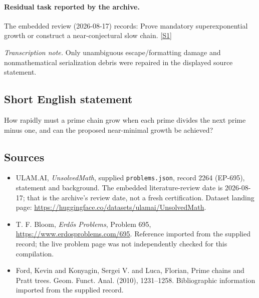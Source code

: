 \documentclass[11pt,a4paper]{article}
\newcommand{\sref}[2]{\hyperlink{source:#1:#2}{[S#2]}}
\begin{document}
\paragraph{Residual task reported by the archive.}

The embedded review (2026-08-17) records: Prove mandatory superexponential growth or construct a near-conjectural slow chain. \sref{2264}{1}

{\small\emph{Transcription note.} Only unambiguous escape/formatting damage and nonmathematical serialization debris were repaired in the displayed source statement.}

\subsection{Short English statement}

How rapidly must a prime chain grow when each prime divides the next prime minus one, and can the proposed near-minimal growth be achieved?

\subsection{Sources}

{\small

\begin{itemize}

\item[\hypertarget{source:2264:1}{S1}] ULAM.AI, \emph{UnsolvedMath}, supplied \texttt{problems.json}, record 2264 (EP-695), statement and background. The embedded literature-review date is 2026-08-17; that is the archive’s review date, not a fresh certification. Dataset landing page: \url{https://huggingface.co/datasets/ulamai/UnsolvedMath}.

\item[\hypertarget{source:2264:2}{S2}] T. F. Bloom, \emph{Erdős Problems}, Problem 695, \url{https://www.erdosproblems.com/695}. Reference imported from the supplied record; the live problem page was not independently checked for this compilation.

\item[\hypertarget{source:2264:3}{S3}] Ford, Kevin and Konyagin, Sergei V. and Luca, Florian, Prime chains and {P}ratt trees. Geom. Funct. Anal. (2010), 1231--1258. Bibliographic information imported from the supplied record.

\end{itemize}

}

\label{end:2264}
\end{document}

